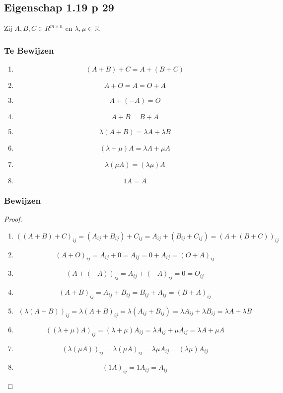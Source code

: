 \documentclass[lineaire_algebra_oplossingen.tex]{subfiles}
\begin{document}
\subsection{Eigenschap 1.19 p 29}
\label{1.19}
Zij $A,B,C \in R^{m\times n}$ en $\lambda, \mu \in \mathbb{R}$.

\subsubsection*{Te Bewijzen}
\begin{enumerate}
\item \[ (A+B)+C=A+(B+C) \]
\item \[ A+O = A = O+A \]
\item \[ A + (-A) = O \]
\item \[ A+B = B+A \]
\item \[ \lambda(A+B) = \lambda A+ \lambda B \]
\item \[ (\lambda+\mu)A = \lambda A+\mu A \]
\item \[ \lambda(\mu A) = (\lambda\mu)A\]
\item \[ 1A =A \]
\end{enumerate}

\subsubsection*{Bewijzen}
\begin{proof}
\begin{enumerate}
\item 
\[
((A+B)+C)_{ij} = (A_{ij} + B_{ij}) + C_{ij} = A_{ij} + (B_{ij} + C_{ij}) = (A+(B+C))_{ij}
\]
\item
\[ (A+O)_{ij} = A_{ij} + 0 = A_{ij} = 0 + A_{ij} = (O+A)_{ij} \]
\item
\[ (A + (-A))_{ij} = A_{ij} + (-A)_{ij} = 0 = O_{ij} \]
\item
\[ (A+B)_{ij} = A_{ij} + B_{ij} = B_{ij} + A_{ij} = (B+A)_{ij} \]
\item
\[ (\lambda(A+B))_{ij} = \lambda(A+B)_{ij} = \lambda (A_{ij} + B_{ij}) = \lambda A_{ij}+ \lambda B_{ij}  = \lambda A+ \lambda B \]
\item
\[ ((\lambda+\mu)A)_{ij} = (\lambda+\mu)A_{ij} = \lambda A_{ij}+\mu A_{ij} = \lambda A+\mu A \]
\item
\[ (\lambda(\mu A))_{ij} = \lambda(\mu A)_{ij} =\lambda\mu A_{ij} = (\lambda\mu)A_{ij}\]
\item
\[ (1A)_{ij}= 1A_{ij} =A_{ij} \]
\end{enumerate}
\end{proof}
\end{document}
